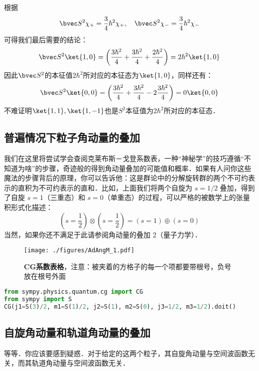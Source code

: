 根据
\begin{equation}
\bvec S^2\chi_+=\frac{3}{4}\hbar^2\chi_+,\quad \bvec S^2\chi_-=\frac{3}{4}\hbar^2\chi_-
\end{equation}
可得我们最后需要的结论：
\begin{equation}
\bvec S^2\ket{1,0}=\left(\frac{3\hbar^2}{4}+\frac{3\hbar^2}{4}+\frac{2\hbar^2}{4}\right)=2\hbar^2\ket{1,0}
\end{equation}
因此$\bvec S^2$的本征值$2\hbar^2$所对应的本征态为$\ket{1,0}$，同样还有：
\begin{equation}
\bvec S^2\ket{0,0}=\left(\frac{3\hbar^2}{4}+\frac{3\hbar^2}{4}-2\frac{3\hbar^2}{4}\right)=0\ket{0,0}
\end{equation}
不难证明$\ket{1,1},\ket{1,-1}$也是$S^2$本征值为$2\hbar^2$所对应的本征态．
\subsection{普遍情况下粒子角动量的叠加}
我们在这里将尝试学会查阅克莱布斯－戈登系数表，一种“神秘学”的技巧遵循“不知道为啥”的步骤，奇迹般的得到角动量叠加的可能值和概率．如果有人问你这些魔法的步骤背后的原理，你可以告诉他：这是群论中的分解旋转群的两个不可约表示的直积为不可约表示的直和．比如，上面我们将两个自旋为 $s=1/2$ 叠加，得到了自旋 $s=1$（三重态）和 $s=0$（单重态）的过程，可以严格的被数学上的张量积形式化描述：
\begin{equation}
(s=\frac{1}{2})\otimes(s=\frac{1}{2})=(s=1)\oplus (s=0)
\end{equation}
当然，如果你还不满足于此请参阅角动量的叠加 2（量子力学）．

\begin{figure}[ht]
\centering
\texttt{[image: ./figures/AdAngM\_1.pdf]}
\caption{\textbf{CG系数表格}，注意：被夹着的方格子的每一个项都要带根号，负号放在根号外面} \label{AdAngM_fig1}
\end{figure}
\begin{lstlisting}[language=python]
from sympy.physics.quantum.cg import CG
from sympy import S
CG(j1=S(3)/2, m1=S(1)/2, j2=S(1), m2=S(0), j3=1/2, m3=1/2).doit()
\end{lstlisting}

\subsection{自旋角动量和轨道角动量的叠加}
等等．你应该要感到疑惑．对于给定的这两个粒子，其自旋角动量与空间波函数无关，而其轨道角动量与空间波函数无关．
